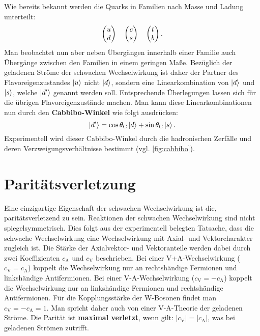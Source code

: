 Wie bereits bekannt werden die Quarks in Familien nach Masse und Ladung unterteilt:
\begin{equation*}
	\begin{pmatrix} u \\ d \end{pmatrix}\quad\begin{pmatrix} c \\ s \end{pmatrix}\quad\begin{pmatrix} t \\ b \end{pmatrix}.
\end{equation*}
Man beobachtet nun aber neben Übergängen innerhalb einer Familie auch Übergänge zwischen den Familien in einem geringen Maße.
Bezüglich der geladenen Ströme der schwachen Wechselwirkung ist daher der Partner des Flavoreigenzustandes $\ket{u}$ nicht $\ket{d}$, sondern eine Linearkombination von $\ket{d}$ und $\ket{s}$, welche $\ket{d'}$ genannt werden soll.
Entsprechende Überlegungen lassen sich für die übrigen Flavoreigenzustände machen.
Man kann diese Linearkombinationen nun durch den \textbf{Cabbibo-Winkel} wie folgt ausdrücken:
\begin{equation*}
	\ket{d'} = \cos\theta_\text{C}\ket{d} + \sin\theta_\text{C}\ket{s}.
\end{equation*}
Experimentell wird dieser Cabbibo-Winkel durch die hadronischen Zerfälle und deren Verzweigungsverhältnisse bestimmt (vgl. \autoref{fig:cabbibo}).

\section{Paritätsverletzung}
Eine einzigartige Eigenschaft der schwachen Wechselwirkung ist die, paritätsverletzend zu sein.
Reaktionen der schwachen Wechselwirkung sind nicht spiegelsymmetrisch.
Dies folgt aus der experimentell belegten Tatsache, dass die schwache Wechselwirkung eine Wechselwirkung mit Axial- und Vektorcharakter zugleich ist.
Die Stärke der Axialvektor- und Vektoranteile werden dabei durch zwei Koeffizienten $c_\text{A}$ und $c_\text{V}$ beschrieben.
Bei einer V+A-Wechselwirkung ($c_\text{V}=c_\text{A}$) koppelt die Wechselwirkung nur an rechtshändige Fermionen und linkshändige Antifermionen.
Bei einer V-A-Wechselwirkung ($c_\text{V}=-c_\text{A}$) koppelt die Wechselwirkung nur an linkshändige Fermionen und rechtshändige Antifermionen.
Für die Kopplungsstärke der W-Bosonen findet man $c_\text{V}=-c_\text{A}=1$.
Man spricht daher auch von einer V-A-Theorie der geladenen Ströme.
Die Parität ist \textbf{maximal verletzt}, wenn gilt: $|c_\text{V}|=|c_\text{A}|$, was bei geladenen Strömen zutrifft.

